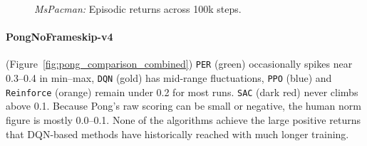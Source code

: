 \begin{figure} 
	\centering
	\quad
	\caption{\emph{MsPacman:} Episodic returns across 100k steps.}
	\label{fig:mspacman_comparison_combined}
\end{figure}

\paragraph{PongNoFrameskip-v4}
(Figure~\ref{fig:pong_comparison_combined})
\texttt{PER} (green) occasionally spikes near 0.3--0.4 in min--max, 
\texttt{DQN} (gold) has mid-range fluctuations, 
\texttt{PPO} (blue) and \texttt{Reinforce} (orange) remain under 0.2 for most runs. 
\texttt{SAC} (dark red) never climbs above 0.1. 
Because Pong’s raw scoring can be small or negative, 
the human norm figure is mostly 0.0--0.1. None of the algorithms achieve 
the large positive returns that DQN-based methods have historically 
reached with much longer training.

